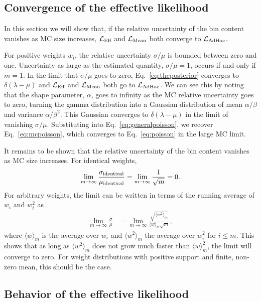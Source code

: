 \documentclass[a4paper, 11pt]{article}
\newcommand{\like}{\mathcal{L}}
\newcommand{\meanl}{\mathcal{L}_{\textmd{Mean}}}
\newcommand{\mcl}{\like_\textmd{Eff}}
\newcommand{\adhoc}{\mathcal{L}_{\textmd{AdHoc}}}
\newcommand{\agpar}{\alpha}
\newcommand{\bgpar}{\beta}
\begin{document}
\subsection{Convergence of the effective likelihood\label{sec:llhconvergence}}

In this section we will show that, if the relative uncertainty of the bin content vanishes as MC size increases, $\mcl$ and $\meanl$ both converge to $\adhoc$.

For positive weights $w_i$, the relative uncertainty $\sigma/\mu$ is bounded between zero and one. Uncertainty as large as the estimated quantity, $\sigma/\mu=1$, occurs if and only if $m=1$. In the limit that $\sigma/\mu$ goes to zero, Eq.~\eqref{eq:theposterior} converges to $\delta(\lambda - \mu)$ and $\mcl$ and $\meanl$ both go to $\adhoc$. We can see this by noting that the shape parameter, $\agpar$, goes to infinity as the MC relative uncertainty goes to zero, turning the gamma distribution into a Gaussian distribution of mean $\agpar / \bgpar$ and variance $\agpar / \bgpar^2$. This Gaussian converges to $\delta(\lambda-\mu)$ in the limit of vanishing $\sigma/\mu$. Substituting into Eq.~\eqref{eq:generalpoisson}, we recover Eq.~\eqref{eq:mcpoisson}, which converges to Eq.~\eqref{eq:poisson} in the large MC limit.

It remains to be shown that the relative uncertainty of the bin content vanishes as MC size increases. For identical weights,
\begin{equation}
\lim_{m\to\infty} \frac{\sigma_{\rm identical}}{\mu_{\rm identical}} = \lim_{m\to\infty} \frac{1}{\sqrt{m}} = 0 .
\end{equation}
For arbitrary weights, the limit can be written in terms of the running average of $w_i$ and $w_i^2$ as
\begin{align}
\lim_{m\to\infty} \frac{\sigma}{\mu} &= \lim_{m\to\infty} \frac{\sqrt{\langle w^2 \rangle_m}}{\langle w\rangle_m\sqrt{m}},
\end{align}
where $\langle w \rangle_m$ is the average over $w_i$ and $\langle w^2 \rangle_m$ the average over $w_i^2$ for $i \leq m$. This shows that as long as $\langle w^2 \rangle_m$ does not grow much faster than $\langle w \rangle_m^2$, the limit will converge to zero. For weight distributions with positive support and finite, non-zero mean, this should be the case.

\subsection{Behavior of the effective likelihood\label{sec:llhbehavior}}
\end{document}
